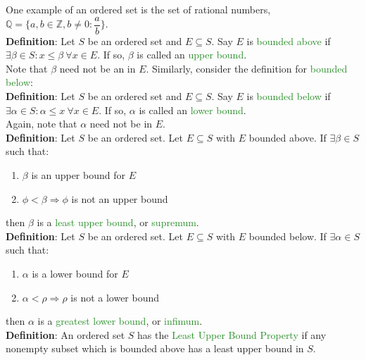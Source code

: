 \documentclass{article}
\begin{document}
One example of an ordered set is the set of rational numbers, $\mathbb{Q} = \bigl\{a,b \in \mathbb{Z}, b \neq 0:\dfrac{a}{b}\bigr\}$.\\

\textbf{Definition}: Let $S$ be an ordered set and $E \subseteq S$. Say $E$ is \textcolor{ForestGreen}{bounded above} if $\exists \beta \in S:x \leq \beta \ \forall x \in E$. If so, $\beta$ is called an \textcolor{ForestGreen}{upper bound}.\\

Note that $\beta$ need not be an in $E$. Similarly, consider the definition for \textcolor{ForestGreen}{bounded below}:\\

\textbf{Definition}: Let $S$ be an ordered set and $E \subseteq S$. Say $E$ is \textcolor{ForestGreen}{bounded below} if $\exists \alpha \in S: \alpha \leq x \ \forall x \in E$. If so, $\alpha$ is called an \textcolor{ForestGreen}{lower bound}.\\

Again, note that $\alpha$ need not be in $E$.\\

\textbf{Definition}: Let $S$ be an ordered set. Let $E \subseteq S$ with $E$ bounded above. If $\exists \beta \in S$ such that:
\begin{enumerate}
    \item $\beta$ is an upper bound for $E$
    \item $\phi < \beta \Longrightarrow \phi$ is not an upper bound
\end{enumerate}

then $\beta$ is a \textcolor{ForestGreen}{least upper bound}, or \textcolor{ForestGreen}{supremum}.\\

\textbf{Definition}: Let $S$ be an ordered set. Let $E \subseteq S$ with $E$ bounded below. If $\exists \alpha \in S$ such that:
\begin{enumerate}
    \item $\alpha$ is a lower bound for $E$
    \item $\alpha < \rho \Longrightarrow \rho$ is not a lower bound
\end{enumerate}

then $\alpha$ is a \textcolor{ForestGreen}{greatest lower bound}, or \textcolor{ForestGreen}{infimum}.\\

\textbf{Definition}: An ordered set $S$ has the \textcolor{ForestGreen}{Least Upper Bound Property} if any nonempty subset which is bounded above has a least upper bound in $S$.\\
\end{document}
